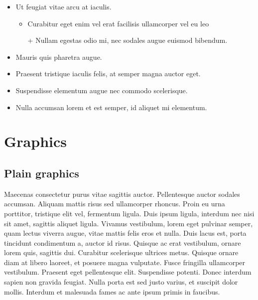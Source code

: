 \documentclass[10pt]{article}
\begin{document}
\begin{itemize}
\item{Ut feugiat vitae arcu at iaculis.
\begin{itemize}
\item{Curabitur eget enim vel erat facilisis ullamcorper vel eu leo}
\item[+]{Nullam egestas odio mi, nec sodales augue euismod bibendum.}
\end{itemize}}
\item{Mauris quis pharetra augue.}
\item{Praesent tristique iaculis felis, at semper magna auctor eget.}
\item{Suspendisse elementum augue nec commodo scelerisque.}
\item{Nulla accumsan lorem et est semper, id aliquet mi elementum.}
\end{itemize}

\section{Graphics}

\subsection{Plain graphics}

Maecenas consectetur purus vitae sagittis auctor. Pellentesque auctor sodales accumsan. Aliquam mattis risus sed ullamcorper rhoncus. Proin eu urna porttitor, tristique elit vel, fermentum ligula. Duis ipsum ligula, interdum nec nisi sit amet, sagittis aliquet ligula. Vivamus vestibulum, lorem eget pulvinar semper, quam lectus viverra augue, vitae mattis felis eros et nulla. Duis lacus est, porta tincidunt condimentum a, auctor id risus. Quisque ac erat vestibulum, ornare lorem quis, sagittis dui. Curabitur scelerisque ultrices metus. Quisque ornare diam at libero laoreet, et posuere magna vulputate. Fusce fringilla ullamcorper vestibulum. Praesent eget pellentesque elit. Suspendisse potenti. Donec interdum sapien non gravida feugiat. Nulla porta est sed justo varius, et suscipit dolor mollis. Interdum et malesuada fames ac ante ipsum primis in faucibus.
\end{document}
